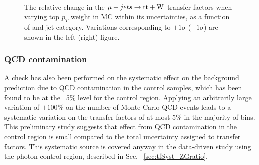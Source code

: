 \begin{figure}[!h]
  \centering
   ~~
  \\

  \caption{\label{fig:tfSyst_topPt_muToTtw} The relative change in the $\mu + jets \rightarrow \mathrm{tt+W}$ transfer
  factors when varying top $p_{T}$ weight in MC within its uncertainties, as a function of \scalht and jet category. 
  Variations corresponding to $+1\sigma$ ($-1\sigma$) are shown in the left (right) figure. 
  }
\end{figure}


\subsubsection*{QCD contamination}
\label{sec:tfSyst_qcdCont}

A check has also been performed on the systematic effect on the
background prediction due to QCD contamination in the control samples,
which has been found to be at the ~5\% level for the \gj
control region. Applying an arbitrarily large variation of $\pm
100\%$ on the number of Monte Carlo QCD events leads to a systematic
variation on the transfer factors of at most 5\% in the majority of bins.
This preliminary study suggests that effect from QCD
contamination in the \gj control region is small compared 
to the total uncertainty assigned to transfer factors. 
This systematic source is covered anyway in the data-driven study  
using the photon control region, described in Sec. ~\ref{sec:tfSyst_ZGratio}.



